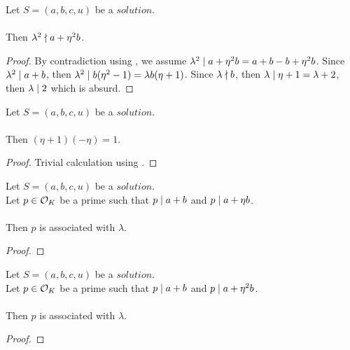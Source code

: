 \begin{lemma}
    \label{lmm:lambda_sq_not_dvd_a_add_eta_sq_mul_b}
    \leanok
    Let $S=(a, b, c, u)$ be a $solution$.\\\\
    Then $\lambda^2 \nmid a + \eta^2  b$.
\end{lemma}
\begin{proof}
    \leanok
    By contradiction using , we assume
    $\lambda^2 \mid a +\eta^2 b = a + b -b + \eta^2  b$.
    Since $\lambda^2 \mid a+b$, then $\lambda^2 \mid b (\eta^2 -1)
    = \lambda b (\eta + 1)$. Since $\lambda \nmid b$, then
    $\lambda \mid \eta+1 = \lambda +2$, then $\lambda \mid 2$ which is absurd.
\end{proof}

\begin{lemma}
    \label{lmm:eta_add_one_inv}
    \leanok
    Let $S=(a, b, c, u)$ be a $solution$.\\\\
    Then $(\eta + 1)  (-\eta) = 1$.
\end{lemma}
\begin{proof}
    \leanok
    Trivial calculation using .
\end{proof}

\begin{lemma}
    \label{lmm:associated_of_dvd_a_add_b_of_dvd_a_add_eta_mul_b}
    \leanok
    Let $S=(a, b, c, u)$ be a $solution$.\\
    Let $p \in \mathcal{O}_K$ be a prime such that $p \mid a+b$
    and $p \mid a+\eta  b$.\\\\
    Then $p$ is associated with $\lambda$.
\end{lemma}
\begin{proof}
    \leanok
\end{proof}

\begin{lemma}
    \label{lmm:associated_of_dvd_a_add_b_of_dvd_a_add_eta_sq_mul_b}
    \leanok
    Let $S=(a, b, c, u)$ be a $solution$.\\
    Let $p \in \mathcal{O}_K$ be a prime such that $p \mid a+b$
    and $p \mid a+\eta^2  b$.\\\\
    Then $p$ is associated with $\lambda$.
\end{lemma}
\begin{proof}
    \leanok
\end{proof}

